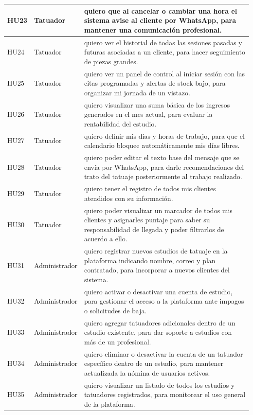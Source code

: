 \documentclass[12pt,letterpaper,oneside]{report}
\begin{document}
\begin{longtable}{|l|p{3.5cm}|p{9.5cm}|}
  HU23 & Tatuador & quiero que al cancelar o cambiar una hora el sistema avise al cliente por WhatsApp, para mantener una comunicación profesional. \\ \hline
  HU24 & Tatuador & quiero ver el historial de todas las sesiones pasadas y futuras asociadas a un cliente, para hacer seguimiento de piezas grandes. \\ \hline
  HU25 & Tatuador & quiero ver un panel de control al iniciar sesión con las citas programadas y alertas de stock bajo, para organizar mi jornada de un vistazo. \\ \hline
  HU26 & Tatuador & quiero visualizar una suma básica de los ingresos generados en el mes actual, para evaluar la rentabilidad del estudio. \\ \hline
  HU27 & Tatuador & quiero definir mis días y horas de trabajo, para que el calendario bloquee automáticamente mis días libres. \\ \hline
  HU28 & Tatuador & quiero poder editar el texto base del mensaje que se envía por WhatsApp, para darle recomendaciones del trato del tatuaje posteriormente al trabajo realizado. \\ \hline
  HU29 & Tatuador & quiero tener el registro de todos mis clientes atendidos con su información. \\ \hline
  HU30 & Tatuador & quiero poder visualizar un marcador de todos mis clientes y asignarles puntaje para saber su responsabilidad de llegada y poder filtrarlos de acuerdo a ello. \\ \hline
  HU31 & Administrador & quiero registrar nuevos estudios de tatuaje en la plataforma indicando nombre, correo y plan contratado, para incorporar a nuevos clientes del sistema. \\ \hline
  HU32 & Administrador & quiero activar o desactivar una cuenta de estudio, para gestionar el acceso a la plataforma ante impagos o solicitudes de baja. \\ \hline
  HU33 & Administrador & quiero agregar tatuadores adicionales dentro de un estudio existente, para dar soporte a estudios con más de un profesional. \\ \hline
  HU34 & Administrador & quiero eliminar o desactivar la cuenta de un tatuador específico dentro de un estudio, para mantener actualizada la nómina de usuarios activos. \\ \hline
  HU35 & Administrador & quiero visualizar un listado de todos los estudios y tatuadores registrados, para monitorear el uso general de la plataforma. \\ \hline

\end{longtable}
\end{document}

